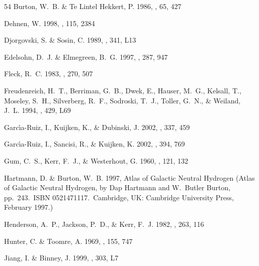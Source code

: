 \documentclass[apj]{emulateapj}
\begin{document}
\begin{thebibliography}{54}
{Burton}, W.~B. \& {Te Lintel Hekkert}, P. 1986, \aaps, 65, 427

{Dehnen}, W. 1998, \aj, 115, 2384

{Djorgovski}, S. \& {Sosin}, C. 1989, \apjl, 341, L13

{Edelsohn}, D.~J. \& {Elmegreen}, B.~G. 1997, \mnras, 287, 947

{Fleck}, R.~C. 1983, \apj, 270, 507

{Freudenreich}, H.~T., {Berriman}, G.~B., {Dwek}, E., {Hauser}, M.~G.,
  {Kelsall}, T., {Moseley}, S.~H., {Silverberg}, R.~F., {Sodroski}, T.~J.,
  {Toller}, G.~N., \& {Weiland}, J.~L. 1994, \apjl, 429, L69

{Garc{\'{\i}}a-Ruiz}, I., {Kuijken}, K., \& {Dubinski}, J. 2002{},
  \mnras, 337, 459

{Garc{\'{\i}}a-Ruiz}, I., {Sancisi}, R., \& {Kuijken}, K. 2002{},
  \aap, 394, 769

{Gum}, C.~S., {Kerr}, F.~J., \& {Westerhout}, G. 1960, \mnras, 121, 132

{Hartmann}, D. \& {Burton}, W.~B. 1997, {Atlas of Galactic Neutral Hydrogen}
  (Atlas of Galactic Neutral Hydrogen, by Dap Hartmann and W.~Butler Burton,
  pp.~243.~ISBN 0521471117.~Cambridge, UK: Cambridge University Press, February
  1997.)

{Henderson}, A.~P., {Jackson}, P.~D., \& {Kerr}, F.~J. 1982, \apj, 263, 116

{Hunter}, C. \& {Toomre}, A. 1969, \apj, 155, 747

{Jiang}, I. \& {Binney}, J. 1999, \mnras, 303, L7


\end{thebibliography}
\end{document}
